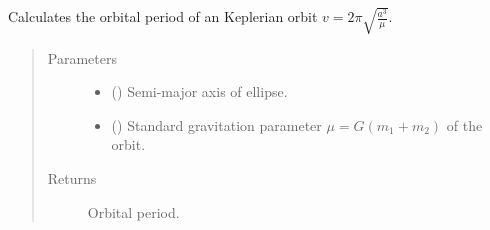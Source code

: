 \documentclass[letterpaper,10pt,english]{sphinxmanual}
\begin{document}
\begin{fulllineitems}
\label{\detokenize{modules/dpt_tools:dpt_tools.orbital_period}}
Calculates the orbital period of an Keplerian orbit \(v = 2\pi\sqrt{\frac{a^3}{\mu}}\).
\begin{quote}\begin{description}
\item[{Parameters}] \leavevmode\begin{itemize}
\item {} 
 () \textendash{} Semi-major axis of ellipse.

\item {} 
 () \textendash{} Standard gravitation parameter \(\mu = G(m_1 + m_2)\) of the orbit.

\end{itemize}

\item[{Returns}] \leavevmode
Orbital period.

\end{description}\end{quote}

\end{fulllineitems}

\end{document}
